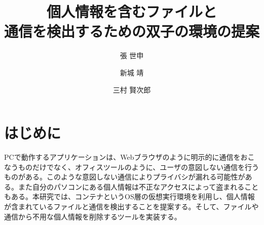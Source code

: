 \documentclass{ipsjpapers}
\def\LATEx{\iLATEX\normalsize}
\def\iLATEX#1{L\kern-.36em\raise.3ex\hbox{#1\bf A}\kern-.15em
    T\kern-.1667em\lower.7ex\hbox{E}\kern-.125emX}
\begin{document}

\title{個人情報を含むファイルと\\通信を検出するための双子の環境の提案}


\author{張 世申 
             \and 新城 靖 
             \and 三村 賢次郎 }



\maketitle







\section{はじめに}
PCで動作するアプリケーションは、Webブラウザのように明示的に通信をおこなうものだけでなく、オフィスツールのように、ユーザの意図しない通信を行うものがある。このような意図しない通信によりプライバシが漏れる可能性がある。また自分のパソコンにある個人情報は不正なアクセスによって盗まれることもある。本研究では、コンテナというOS層の仮想実行環境を利用し、個人情報が含まれているファイルと通信を検出することを提案する。そして、ファイルや通信から不用な個人情報を削除するツールを実装する。
\end{document}
